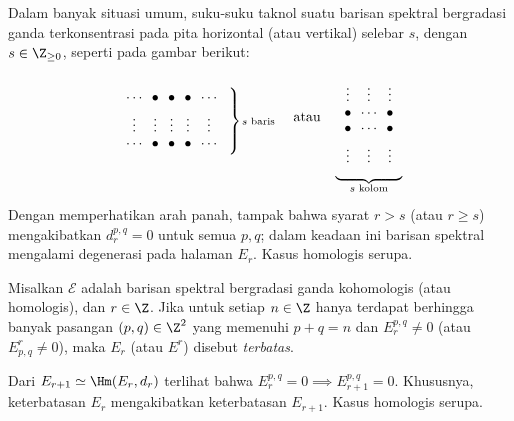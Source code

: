 \begin{example}\label{eg:SS-finite-width}
	Dalam banyak situasi umum, suku-suku taknol suatu barisan spektral
	bergradasi ganda terkonsentrasi pada pita horizontal (atau vertikal)
	selebar $s$, dengan $s\in\Z_{\geq0}$, seperti pada gambar berikut:
	\[\begin{tikzpicture}[baseline]
		\matrix (M) [matrix of math nodes, right delimiter=\}] {
			\cdots & \bullet & \bullet & \bullet & \cdots \\
			\vdots & \vdots & \vdots & \vdots & \vdots \\
			\cdots & \bullet & \bullet & \bullet & \cdots \\
		};
		\node[right=2em] at (M-2-5) {\scriptsize \text{$s$ baris}};
	\end{tikzpicture} \quad \text{atau} \quad \begin{tikzpicture}[baseline]
		\matrix (M) [matrix of math nodes, below delimiter=\}] {
			\vdots & \vdots & \vdots \\
			\bullet & \cdots & \bullet \\
			\bullet & \cdots & \bullet \\
			\vdots & \vdots & \vdots \\
		};
		\node[below=2em] at (M-4-2) {\scriptsize \text{$s$ kolom}};
	\end{tikzpicture}\]
	Dengan memperhatikan arah panah, tampak bahwa syarat $r>s$ (atau $r\geq s$)
	mengakibatkan $d_r^{p,q}=0$ untuk semua $p,q$; dalam keadaan ini barisan
	spektral mengalami degenerasi pada halaman $E_r$. Kasus homologis serupa.
\end{example}

\begin{definition}\label{def:bdd-ss}
	Misalkan $\mathscr{E}$ adalah barisan spektral bergradasi ganda kohomologis
	(atau homologis), dan $r\in\Z$. Jika untuk setiap $n\in\Z$ hanya terdapat
	berhingga banyak pasangan $(p,q)\in\Z^2$ yang memenuhi $p+q=n$ dan
	$E_r^{p,q}\neq0$ (atau $E^r_{p,q}\neq0$), maka $E_r$ (atau $E^r$)
	disebut \emph{terbatas}.
\end{definition}

Dari $E_{r+1}\simeq\Hm(E_r,d_r)$ terlihat bahwa
$E_r^{p,q}=0\implies E_{r+1}^{p,q}=0$. Khususnya, keterbatasan $E_r$
mengakibatkan keterbatasan $E_{r+1}$. Kasus homologis serupa.

